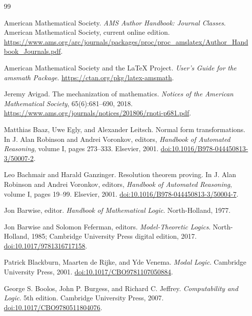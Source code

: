 \documentclass[11pt,oneside,openany]{book}
\theoremstyle{definition}
\theoremstyle{plain}
\theoremstyle{remark}
\begin{document}
\cleardoublepage
{}
{}
\begin{thebibliography}{99}

American Mathematical Society.
\emph{AMS Author Handbook: Journal Classes}.
American Mathematical Society, current online edition.
\url{https://www.ams.org/arc/journals/packages/proc/proc_amslatex/Author_Handbook_Journals.pdf}.

American Mathematical Society and the \LaTeX{} Project.
\emph{User's Guide for the amsmath Package}.
\url{https://ctan.org/pkg/latex-amsmath}.

Jeremy Avigad.
The mechanization of mathematics.
\emph{Notices of the American Mathematical Society}, 65(6):681--690, 2018.
\url{https://www.ams.org/journals/notices/201806/rnoti-p681.pdf}.

Matthias Baaz, Uwe Egly, and Alexander Leitsch.
Normal form transformations.
In J. Alan Robinson and Andrei Voronkov, editors,
\emph{Handbook of Automated Reasoning}, volume I, pages 273--333.
Elsevier, 2001.
\href{https://doi.org/10.1016/B978-044450813-3/50007-2}{doi:10.1016/B978-044450813-3/50007-2}.

Leo Bachmair and Harald Ganzinger.
Resolution theorem proving.
In J. Alan Robinson and Andrei Voronkov, editors,
\emph{Handbook of Automated Reasoning}, volume I, pages 19--99.
Elsevier, 2001.
\href{https://doi.org/10.1016/B978-044450813-3/50004-7}{doi:10.1016/B978-044450813-3/50004-7}.

Jon Barwise, editor.
\emph{Handbook of Mathematical Logic}.
North-Holland, 1977.

Jon Barwise and Solomon Feferman, editors.
\emph{Model-Theoretic Logics}.
North-Holland, 1985; Cambridge University Press digital edition, 2017.
\href{https://doi.org/10.1017/9781316717158}{doi:10.1017/9781316717158}.

Patrick Blackburn, Maarten de Rijke, and Yde Venema.
\emph{Modal Logic}.
Cambridge University Press, 2001.
\href{https://doi.org/10.1017/CBO9781107050884}{doi:10.1017/CBO9781107050884}.

George S. Boolos, John P. Burgess, and Richard C. Jeffrey.
\emph{Computability and Logic}. 5th edition.
Cambridge University Press, 2007.
\href{https://doi.org/10.1017/CBO9780511804076}{doi:10.1017/CBO9780511804076}.


\end{thebibliography}
\end{document}
